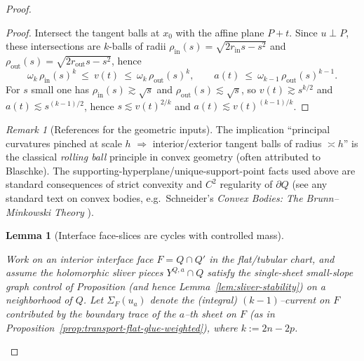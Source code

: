 \documentclass[11pt]{article}
\newcommand{\REV}[1]{\textcolor{blue}{#1}}
\newcommand{\REVMZ}[1]{\textcolor{teal}{#1}}  %
\numberwithin{equation}{section}  %
\theoremstyle{plain}
\newtheorem{lemma}[theorem]{Lemma}
\theoremstyle{definition}
\theoremstyle{remark}
\newtheorem{remark}[theorem]{Remark}
\begin{document}
\begin{proof}
\begin{proof}
Intersect the tangent balls at $x_0$ with the affine plane $P+t$.  Since $u\perp P$, these intersections are $k$-balls of radii
$\rho_{\mathrm{in}}(s)=\sqrt{2r_{\mathrm{in}}s-s^2}$ and $\rho_{\mathrm{out}}(s)=\sqrt{2r_{\mathrm{out}}s-s^2}$, hence
\[
\omega_k\,\rho_{\mathrm{in}}(s)^k\ \le\ v(t)\ \le\ \omega_k\,\rho_{\mathrm{out}}(s)^k,
\qquad
a(t)\ \le\ \omega_{k-1}\,\rho_{\mathrm{out}}(s)^{k-1}.
\]
For $s$ small one has $\rho_{\mathrm{in}}(s)\gtrsim \sqrt{s}$ and $\rho_{\mathrm{out}}(s)\lesssim \sqrt{s}$, so $v(t)\gtrsim s^{k/2}$ and
$a(t)\lesssim s^{(k-1)/2}$, hence $s\lesssim v(t)^{2/k}$ and $a(t)\lesssim v(t)^{(k-1)/k}$.
\end{proof}


\begin{remark}[References for the geometric inputs]
The implication ``principal curvatures pinched at scale $h$ $\Rightarrow$ interior/exterior tangent balls of radius $\asymp h$'' is the classical
\emph{rolling ball} principle in convex geometry \REVMZ{\cite{Schneider14}} (often attributed to Blaschke).
The supporting-hyperplane/unique-support-point facts used above are standard consequences of strict convexity and $C^2$ regularity of $\partial Q$
(see any standard text on convex bodies, e.g.\ Schneider's \emph{Convex Bodies: The Brunn--Minkowski Theory}\REV{ \cite{Schneider14}}).
\end{remark}












\begin{lemma}[{Interface face-slices are cycles with controlled mass}]\label{lem:face-slice-cycle-mass}

Work on an interior interface face $F=Q\cap Q'$ in the flat/tubular chart, and assume the holomorphic sliver pieces
$Y^{Q,a}\cap Q$ satisfy the single-sheet small-slope graph control of Proposition
(and hence Lemma~\ref{lem:sliver-stability}) on a neighborhood of $Q$.
Let $\Sigma_F(u_a)$ denote the (integral) $(k-1)$--current on $F$ contributed by the boundary trace of the $a$--th sheet on $F$
(as in Proposition~\ref{prop:transport-flat-glue-weighted}), where $k:=2n-2p$.


\end{lemma}
\end{proof}
\end{document}
